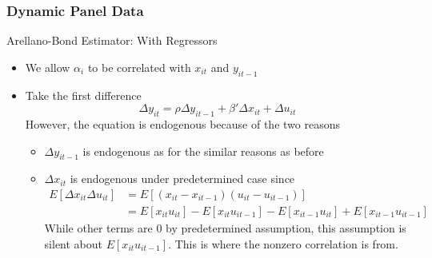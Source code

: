 \documentclass{beamer}
\begin{document}
\begin{frame}
\frametitle{Dynamic Panel Data}
Arellano-Bond Estimator: With Regressors
\begin{itemize}
\item We allow $\alpha_i$ to be correlated with $x_{it}$ and $y_{it-1}$
\item Take the first difference
\[
\Delta y_{it}=\rho \Delta y_{it-1}+\beta'\Delta x_{it}+\Delta  u_{it}
\]
However, the equation is endogenous because of the two reasons
\begin{itemize}
\item $\Delta y_{it-1}$ is endogenous as for the similar reasons as before
\item  $\Delta x_{it}$ is endogenous under predetermined case since
\begin{align*}
E[\Delta x_{it}\Delta u_{it}]&=E[(x_{it}-x_{it-1})(u_{it}-u_{it-1})]\\
&=E[x_{it}u_{it}]-E[x_{it}u_{it-1}]-E[x_{it-1}u_{it}]+E[x_{it-1}u_{it-1}]
\end{align*}
While other terms are 0 by predetermined assumption, this assumption is silent about $E[x_{it}u_{it-1}]$. This is where the nonzero correlation is from. 
\end{itemize}
\end{itemize}
\end{frame}
\end{document}
